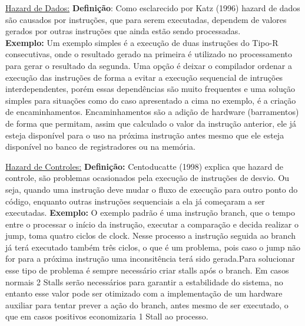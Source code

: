 \documentclass[10pt]{article}
\begin{document}
\ul{Hazard de Dados:} \textbf{Defini{\c c}{\~a}o}: Como esclarecido por Katz (1996) hazard de dados s{\~a}o causados por instru{\c c}{\~o}es, que para serem executadas, dependem de valores gerados por outras instru{\c c}{\~o}es que ainda est{\~a}o sendo processadas.\\
\textbf{Exemplo:} Um exemplo simples {\'e} a execu{\c c}{\~a}o de duas instru{\c c}{\~o}es do Tipo-R consecutivas, onde o resultado gerado na primeira {\'e} utilizado no processamento para gerar o resultado da segunda. Uma op{\c c}{\~a}o {\'e} deixar o compilador ordenar a execu{\c c}{\~a}o das instru{\c c}{\~o}es de forma a evitar a execu{\c c}{\~a}o sequencial de intru{\c c}{\~o}es interdependentes, por{\'e}m essas depend{\^e}ncias s{\~a}o muito frequentes e uma solu{\c c}{\~a}o simples para situa{\c c}{\~o}es como do caso apresentado a cima no exemplo, {\'e} a cria{\c c}{\~a}o de encaminhamentos. Encaminhamentos s{\~a}o a adi{\c c}{\~a}o de hardware (barramentos) de forma que permitam, assim que calculado o valor da instru{\c c}{\~a}o anterior, ele j{\'a} esteja dispon{\'i}vel para o uso na pr{\'o}xima instru{\c c}{\~a}o antes mesmo que ele esteja dispon{\'i}vel no banco de registradores ou na mem{\'o}ria. \medskip

\ul{Hazard de Controles:} \textbf{Defini{\c c}{\~a}o:} Centoducatte (1998) explica que hazard de controle, s{\~a}o problemas ocasionados pela execu{\c c}{\~a}o de instru{\c c}{\~o}es de desvio. Ou seja, quando uma instru{\c c}{\~a}o deve mudar o fluxo de execu{\c c}{\~a}o para outro ponto do c{\'o}digo, enquanto outras instru{\c c}{\~o}es sequenciais a ela j{\'a} come{\c c}aram a ser executadas.
\textbf{Exemplo:} O exemplo padr{\~a}o {\'e} uma instru{\c c}{\~a}o branch, que o tempo entre o processar o in{\'i}cio da instru{\c c}{\~a}o, executar a compara{\c c}{\~a}o e decida realizar o jump, toma quatro ciclos de clock. Nesse processo a instru{\c c}{\~a}o seguida ao branch j{\'a} ter{\'a} executado tamb{\'e}m tr{\^e}s ciclos, o que {\'e} um problema, pois caso o jump n{\~a}o for para a pr{\'o}xima instru{\c c}{\~a}o uma inconsit{\^e}ncia ter{\'a} sido gerada.Para solucionar esse tipo de problema {\'e} sempre necess{\'a}rio criar stalls ap{\'o}s o branch. Em casos normais 2 Stalls ser{\~a}o necess{\'a}rios para garantir a estabilidade do sistema, no entanto esse valor pode ser otimizado com a implementa{\c c}{\~a}o de um hardware auxiliar para tentar prever a a{\c c}{\~a}o do branch, antes mesmo de ser executado, o que em casos positivos economizaria 1 Stall ao processo.
\end{document}
